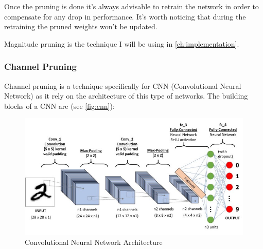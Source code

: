 Once the pruning is done it's always advisable to retrain the network in order
to compensate for any drop in performance. It's worth noticing that during the
retraining the pruned weights won't be updated.~\cite{magnitude_pruning}

Magnitude pruning is the technique I will be using in
\autoref{ch:implementation}.

\subsubsection{Channel Pruning}
Channel pruning is a technique specifically for CNN (Convolutional Neural
Network) as it rely on the architecture of this type of networks. The building
blocks of a CNN are (see \autoref{fig:cnn}):

\begin{figure}[ht]
    \includegraphics[width=\textwidth]{images/pruning/cnn.jpeg}
    \centering
    \caption{Convolutional Neural Network Architecture}\label{fig:cnn}
\end{figure}

